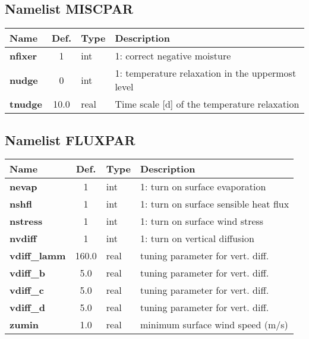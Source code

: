 \subsection{Namelist MISCPAR}
\begin{tabular}{|l|c|l|l|}                                  
\hline                                                        
Name   & Def. & Type & Description \\               
\hline                                                        
{\bf nfixer} & 1 & int & 1: correct negative moisture \\
{\bf nudge } & 0 & int & 1: temperature relaxation in the uppermost level \\
{\bf tnudge} & 10.0 & real & Time scale [d] of the temperature relaxation \\
\hline                                                        
\end{tabular}


\subsection{Namelist FLUXPAR}
\begin{tabular}{|l|c|l|l|}                                  
\hline                                                        
Name   & Def. & Type & Description \\               
\hline                                                        
{\bf nevap  }& 1 & int & 1: turn on surface evaporation \\  
{\bf nshfl  }& 1 & int & 1: turn on surface sensible heat flux \\
{\bf nstress }& 1 & int & 1: turn on surface wind stress \\
{\bf nvdiff  }& 1 & int & 1: turn on vertical diffusion \\
{\bf vdiff\_lamm  }& 160.0 & real & tuning parameter for vert. diff. \\
{\bf vdiff\_b  }& 5.0 & real & tuning parameter for vert. diff. \\
{\bf vdiff\_c }& 5.0 & real & tuning parameter for vert. diff. \\
{\bf vdiff\_d  }& 5.0 & real & tuning parameter for vert. diff. \\
{\bf zumin }& 1.0 & real & minimum surface wind speed (m/s) \\
\hline                                                        
\end{tabular}

